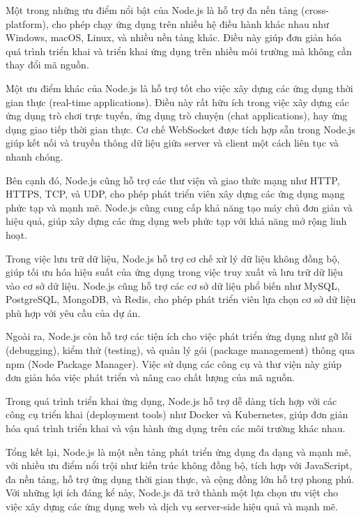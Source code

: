 Một trong những ưu điểm nổi bật của Node.js là hỗ trợ đa nền tảng (cross-platform), cho phép chạy ứng dụng trên nhiều hệ điều hành khác nhau như Windows, macOS, Linux, và nhiều nền tảng khác. Điều này giúp đơn giản hóa quá trình triển khai và triển khai ứng dụng trên nhiều môi trường mà không cần thay đổi mã nguồn. \cite{nodejs_2}

Một ưu điểm khác của Node.js là hỗ trợ tốt cho việc xây dựng các ứng dụng thời gian thực (real-time applications). Điều này rất hữu ích trong việc xây dựng các ứng dụng trò chơi trực tuyến, ứng dụng trò chuyện (chat applications), hay ứng dụng giao tiếp thời gian thực. Cơ chế WebSocket được tích hợp sẵn trong Node.js giúp kết nối và truyền thông dữ liệu giữa server và client một cách liên tục và nhanh chóng.

Bên cạnh đó, Node.js cũng hỗ trợ các thư viện và giao thức mạng như HTTP, HTTPS, TCP, và UDP, cho phép phát triển viên xây dựng các ứng dụng mạng phức tạp và mạnh mẽ. Node.js cũng cung cấp khả năng tạo máy chủ đơn giản và hiệu quả, giúp xây dựng các ứng dụng web phức tạp với khả năng mở rộng linh hoạt.

Trong việc lưu trữ dữ liệu, Node.js hỗ trợ cơ chế xử lý dữ liệu không đồng bộ, giúp tối ưu hóa hiệu suất của ứng dụng trong việc truy xuất và lưu trữ dữ liệu vào cơ sở dữ liệu. Node.js cũng hỗ trợ các cơ sở dữ liệu phổ biến như MySQL, PostgreSQL, MongoDB, và Redis, cho phép phát triển viên lựa chọn cơ sở dữ liệu phù hợp với yêu cầu của dự án.

Ngoài ra, Node.js còn hỗ trợ các tiện ích cho việc phát triển ứng dụng như gỡ lỗi (debugging), kiểm thử (testing), và quản lý gói (package management) thông qua npm (Node Package Manager). Việc sử dụng các công cụ và thư viện này giúp đơn giản hóa việc phát triển và nâng cao chất lượng của mã nguồn.

Trong quá trình triển khai ứng dụng, Node.js hỗ trợ dễ dàng tích hợp với các công cụ triển khai (deployment tools) như Docker và Kubernetes, giúp đơn giản hóa quá trình triển khai và vận hành ứng dụng trên các môi trường khác nhau.

Tổng kết lại, Node.js là một nền tảng phát triển ứng dụng đa dạng và mạnh mẽ, với nhiều ưu điểm nổi trội như kiến trúc không đồng bộ, tích hợp với JavaScript, đa nền tảng, hỗ trợ ứng dụng thời gian thực, và cộng đồng lớn hỗ trợ phong phú. Với những lợi ích đáng kể này, Node.js đã trở thành một lựa chọn ưu việt cho việc xây dựng các ứng dụng web và dịch vụ server-side hiệu quả và mạnh mẽ.

